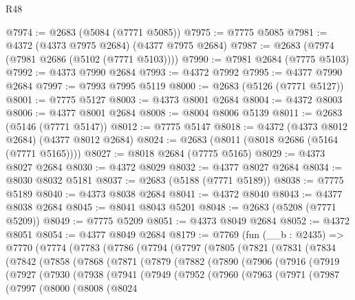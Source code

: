 \begin{lexlean}{R48}
\begin{coremodule}
@7974 := @2683 (@5084 (@7771 @5085))
@7975 := @7775 @5085
@7981 := @4372 (@4373 @7975 @2684) (@4377 @7975 @2684)
@7987 := @2683 (@7974 (@7981 @2686 (@5102 (@7771 @5103))))
@7990 := @7981 @2684 (@7775 @5103)
@7992 := @4373 @7990 @2684
@7993 := @4372 @7992
@7995 := @4377 @7990 @2684
@7997 := @7993 @7995 @5119
@8000 := @2683 (@5126 (@7771 @5127))
@8001 := @7775 @5127
@8003 := @4373 @8001 @2684
@8004 := @4372 @8003
@8006 := @4377 @8001 @2684
@8008 := @8004 @8006 @5139
@8011 := @2683 (@5146 (@7771 @5147))
@8012 := @7775 @5147
@8018 := @4372 (@4373 @8012 @2684) (@4377 @8012 @2684)
@8024 := @2683 (@8011 (@8018 @2686 (@5164 (@7771 @5165))))
@8027 := @8018 @2684 (@7775 @5165)
@8029 := @4373 @8027 @2684
@8030 := @4372 @8029
@8032 := @4377 @8027 @2684
@8034 := @8030 @8032 @5181
@8037 := @2683 (@5188 (@7771 @5189))
@8038 := @7775 @5189
@8040 := @4373 @8038 @2684
@8041 := @4372 @8040
@8043 := @4377 @8038 @2684
@8045 := @8041 @8043 @5201
@8048 := @2683 (@5208 (@7771 @5209))
@8049 := @7775 @5209
@8051 := @4373 @8049 @2684
@8052 := @4372 @8051
@8054 := @4377 @8049 @2684
@8179 := @7769
    (fun (__b : @2435) =>
    @7770
      (@7774
        (@7783
          (@7786
            (@7794
              (@7797
                (@7805
                  (@7821
                    (@7831
                      (@7834
                        (@7842
                          (@7858
                            (@7868
                              (@7871
                                (@7879
                                  (@7882
                                    (@7890
                                      (@7906
                                        (@7916
                                          (@7919
                                            (@7927
                                              (@7930
                                                (@7938
                                                  (@7941
                                                    (@7949
                                                      (@7952
                                                        (@7960
                                                          (@7963
                                                            (@7971
                                                              (@7987
                                                                (@7997
                                                                  (@8000
                                                                    (@8008
                                                                      (@8024

\end{coremodule}
\end{lexlean}
